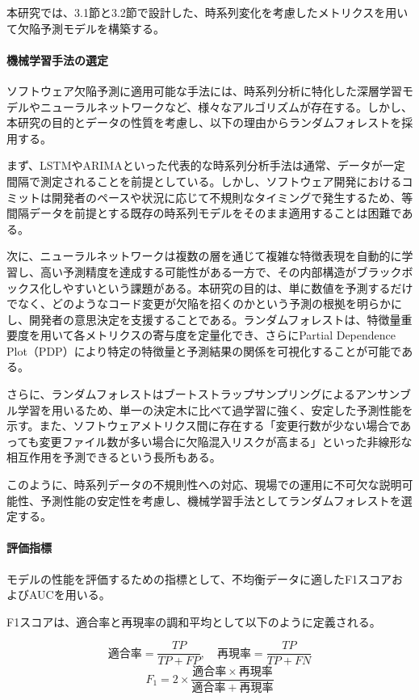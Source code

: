 本研究では、3.1節と3.2節で設計した、時系列変化を考慮したメトリクスを用いて欠陥予測モデルを構築する。

\paragraph{機械学習手法の選定}
ソフトウェア欠陥予測に適用可能な手法には、時系列分析に特化した深層学習モデルやニューラルネットワークなど、様々なアルゴリズムが存在する。しかし、本研究の目的とデータの性質を考慮し、以下の理由からランダムフォレストを採用する。

まず、LSTMやARIMAといった代表的な時系列分析手法は通常、データが一定間隔で測定されることを前提としている。しかし、ソフトウェア開発におけるコミットは開発者のペースや状況に応じて不規則なタイミングで発生するため、等間隔データを前提とする既存の時系列モデルをそのまま適用することは困難である。

次に、ニューラルネットワークは複数の層を通じて複雑な特徴表現を自動的に学習し、高い予測精度を達成する可能性がある一方で、その内部構造がブラックボックス化しやすいという課題がある。本研究の目的は、単に数値を予測するだけでなく、どのようなコード変更が欠陥を招くのかという予測の根拠を明らかにし、開発者の意思決定を支援することである。ランダムフォレストは、特徴量重要度を用いて各メトリクスの寄与度を定量化でき、さらにPartial Dependence Plot（PDP）により特定の特徴量と予測結果の関係を可視化することが可能である。

さらに、ランダムフォレストはブートストラップサンプリングによるアンサンブル学習を用いるため、単一の決定木に比べて過学習に強く、安定した予測性能を示す。また、ソフトウェアメトリクス間に存在する「変更行数が少ない場合であっても変更ファイル数が多い場合に欠陥混入リスクが高まる」といった非線形な相互作用を予測できるという長所もある。

このように、時系列データの不規則性への対応、現場での運用に不可欠な説明可能性、予測性能の安定性を考慮し、機械学習手法としてランダムフォレストを選定する。

\paragraph{評価指標}
モデルの性能を評価するための指標として、不均衡データに適したF1スコアおよびAUCを用いる。

F1スコアは、適合率と再現率の調和平均として以下のように定義される。

\begin{equation}
    適合率 = \frac{TP}{TP + FP}, \quad 再現率 = \frac{TP}{TP + FN}
\end{equation}
\begin{equation}
    F_1 = 2 \times \frac{適合率 \times 再現率}{適合率 + 再現率}
\end{equation}

